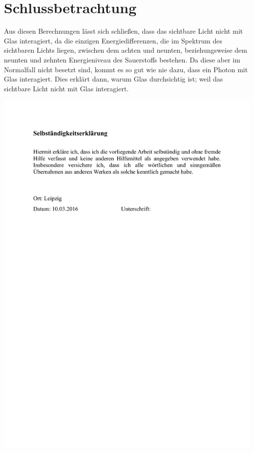 \documentclass[11pt,a4paper,oneside]{report}
\begin{document}
\fi


\chapter{Schlussbetrachtung}
Aus diesen Berechnungen lässt sich schließen, dass das sichtbare Licht nicht mit Glas interagiert, da die einzigen Energiedifferenzen, die im Spektrum des sichtbaren Lichts liegen, zwischen dem achten und neunten, beziehungsweise dem neunten und zehnten Energieniveau des Sauerstoffs bestehen. Da diese aber im Normalfall nicht besetzt sind, kommt es so gut wie nie dazu, dass ein Photon mit Glas interagiert. Dies erklärt dann, warum Glas durchsichtig ist; weil das sichtbare Licht nicht mit Glas interagiert.

\clearpage

\pagestyle{empty}


\listoftables

\listoffigures



\newpage

\pagestyle{empty}

\includegraphics[scale=0.75]{Selbständigkeitserklärung.pdf}
\end{document}
